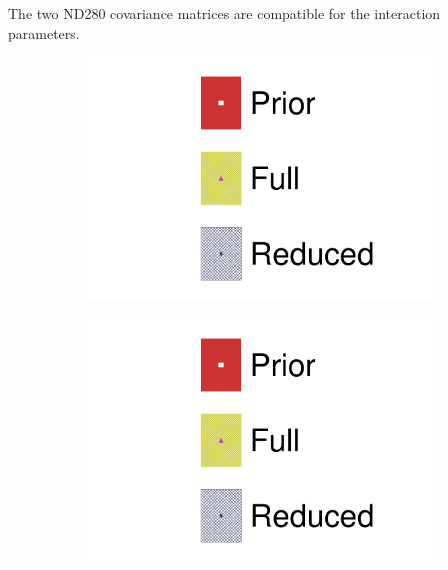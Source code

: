 The two ND280 covariance matrices are compatible for the interaction parameters.
\begin{figure}[h]
	\centering
	\begin{subfigure}[t]{0.49\textwidth}
		\includegraphics[width=\textwidth,page=18, trim={0mm 0mm 0mm 9mm}, clip]{figures/mach3/2018/asimov/2018a_FixedCov_FullCov_Mpi_Asimov_merg_2018a_FixedCov_RedCov_Mpi_Asimov_merge}
	\end{subfigure}
	\begin{subfigure}[t]{0.49\textwidth}
		\includegraphics[width=\textwidth,page=19, trim={0mm 0mm 0mm 9mm}, clip]{figures/mach3/2018/asimov/2018a_FixedCov_FullCov_Mpi_Asimov_merg_2018a_FixedCov_RedCov_Mpi_Asimov_merge}
	\end{subfigure}


\end{figure}

